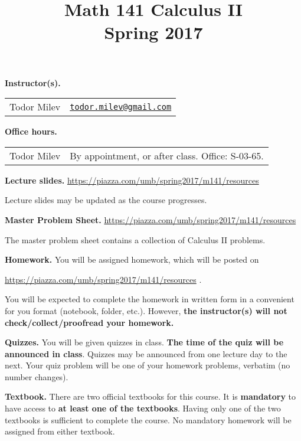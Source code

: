 \documentclass{article}
\title{Math 141 Calculus II \\ Spring 2017}
\date{}
\newcommand{\websitebase}{https://piazza.com/umb/spring2017/m141}
\begin{document}
\maketitle

\noindent \textbf{Instructor(s).} 
\begin{tabular}{ll}
Todor Milev & \href{mailto:todor.milev@gmail.com}{\nolinkurl{todor.milev@gmail.com}} 
\end{tabular}

\medskip
\noindent \textbf{Office hours. } \begin{tabular}{lp{12cm}}
Todor Milev & By appointment, or after class. Office: S-03-65.\\
\end{tabular}





\medskip \noindent \textbf{Lecture slides. }  \url{\websitebase/resources}

\medskip\noindent Lecture slides may be updated as the course progresses.


\medskip \noindent \textbf{Master Problem Sheet. }  \url{\websitebase/resources} 

\medskip\noindent The master problem sheet contains a collection of Calculus II problems. 

\medskip
\noindent \textbf{Homework.} You will be assigned homework, which will be posted on

\url{\websitebase/resources} \quad \quad \quad .

\noindent You will be expected to complete the homework in written form in a convenient for you format (notebook, folder, etc.). However, \textbf{the instructor(s) will not check/collect/proofread your homework.} 
 
\medskip
\noindent \textbf{Quizzes.} You will be given quizzes in class. \textbf{The time of the quiz will be announced in class}. Quizzes may be announced from one lecture day to the next. Your quiz problem will be one of your homework problems, verbatim (no number changes).

\medskip\noindent \textbf{Textbook. } There are two official textbooks for this course. It is  \textbf{mandatory} to have access to \textbf{at least one of the textbooks}. Having only one of the two textbooks is sufficient to complete the course. No mandatory homework will be assigned from either textbook. 
\end{document}
